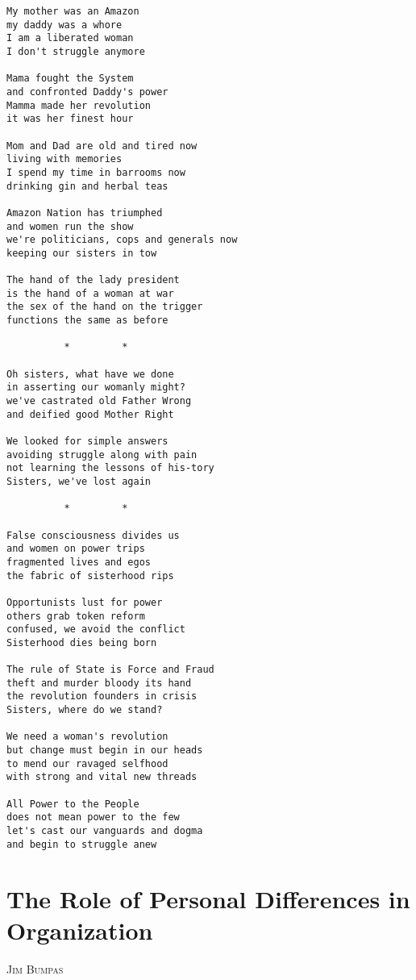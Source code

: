 \documentclass[12pt, onecolumn, letterpaper, oneside]{book}
\makeatletter
\newcommand\chapterauthor[1]{\authortoc{#1}\printchapterauthor{#1}}
\newcommand{\printchapterauthor}[1]{%
  {\parindent0pt\vspace*{-25pt}%
  \linespread{1.1}\large\scshape#1%
  \par\nobreak\vspace*{35pt}}
  \@afterheading%
}
\newcommand{\authortoc}[1]{%
  \addtocontents{toc}{\vskip-10pt}%
  \addtocontents{toc}{%
    \protect\contentsline{chapter}%
    {\hskip1.3em\mdseries\scshape\protect\scriptsize#1}{}{}}
  \addtocontents{toc}{\vskip5pt}%
}
\makeatother
\begin{document}
\begin{verbatim}
My mother was an Amazon
my daddy was a whore
I am a liberated woman
I don't struggle anymore

Mama fought the System
and confronted Daddy's power
Mamma made her revolution
it was her finest hour

Mom and Dad are old and tired now
living with memories
I spend my time in barrooms now
drinking gin and herbal teas

Amazon Nation has triumphed
and women run the show
we're politicians, cops and generals now
keeping our sisters in tow

The hand of the lady president
is the hand of a woman at war
the sex of the hand on the trigger
functions the same as before

          *         *
          
Oh sisters, what have we done
in asserting our womanly might?
we've castrated old Father Wrong
and deified good Mother Right

We looked for simple answers
avoiding struggle along with pain
not learning the lessons of his-tory
Sisters, we've lost again

          *         *

False consciousness divides us
and women on power trips
fragmented lives and egos
the fabric of sisterhood rips

Opportunists lust for power
others grab token reform
confused, we avoid the conflict
Sisterhood dies being born

The rule of State is Force and Fraud
theft and murder bloody its hand
the revolution founders in crisis
Sisters, where do we stand?

We need a woman's revolution
but change must begin in our heads
to mend our ravaged selfhood
with strong and vital new threads

All Power to the People
does not mean power to the few
let's cast our vanguards and dogma
and begin to struggle anew
\end{verbatim}


\chapter{The Role of Personal Differences in Organization}
\chapterauthor{Jim Bumpas}
\end{document}
